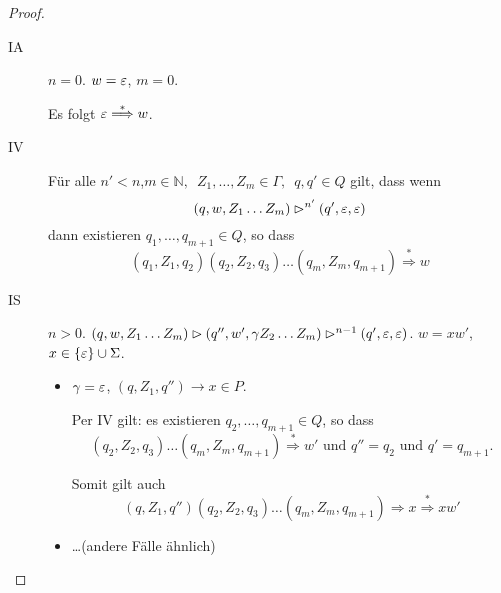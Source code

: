 \begin{proof}
\begin{itemize}
      \begin{description}
      \item[IA] $n = 0$.
        $w = \varepsilon$, $m = 0$.

        Es folgt $\varepsilon \stackrel{*}{\Longrightarrow} w$.
      \item[IV] Für alle $n' < n$,\enspace $m \in \mathbb{N},\enspace Z_1,\ldots,Z_m\in \Gamma,\enspace q,q' \in Q$ gilt, dass wenn
        \begin{displaymath}
        (q,w,Z_1\ldots Z_m) \rhd^{n'} (q', \varepsilon, \varepsilon)
      \end{displaymath}
      dann existieren $q_1,\ldots,q_{m+1} \in Q$, so dass
      \begin{displaymath}
        (q_1,Z_1,q_2)(q_2,Z_2,q_3)\ldots(q_m,Z_m,q_{m+1}) \stackrel{*}{\Longrightarrow} w
      \end{displaymath}

    \item[IS] $n > 0$.
      $(q, w, Z_1\ldots Z_m) \rhd (q'', w', \gamma Z_2\ldots Z_m) \rhd^{n-1} (q',\varepsilon, \varepsilon)$.
      $w =xw'$, \enspace $x \in \{\varepsilon\} \cup \Sigma$.
      \begin{itemize}
      \item $\gamma = \varepsilon$, \enspace $(q, Z_1, q'') \to x \in P$.

        Per IV gilt: es existieren $q_2,\ldots,q_{m+1} \in Q$, so dass
        \begin{displaymath}
          (q_2, Z_2, q_3)\ldots(q_m,Z_m,q_{m+1}) \stackrel{*}{\Longrightarrow} w' \text{ und } q''=q_2 \text{ und } q'=q_{m+1}.
        \end{displaymath}

        Somit gilt auch
        \begin{displaymath}
          (q, Z_1, q'') (q_2, Z_2, q_3)\ldots(q_m,Z_m,q_{m+1})\Longrightarrow x\stackrel{*}{\Longrightarrow} xw'
        \end{displaymath}
      \item \ldots (andere Fälle ähnlich)
      \end{itemize}
      \end{description}
  \end{itemize}
\end{proof}



